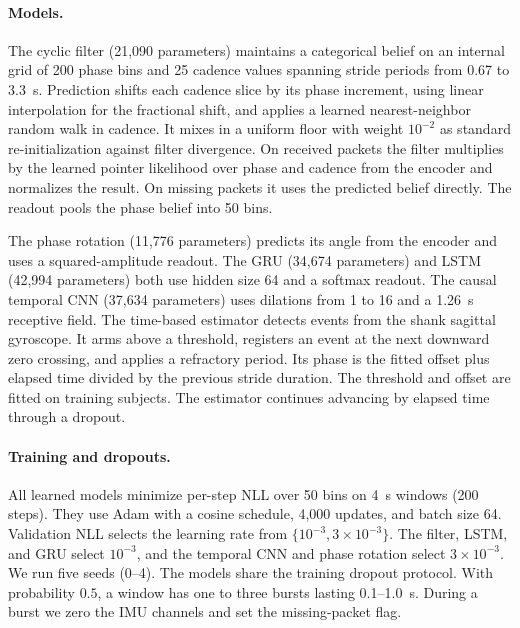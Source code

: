 \paragraph{Models.}
The cyclic filter (21,090 parameters) maintains a categorical belief on an
internal grid of 200 phase bins and 25 cadence values spanning stride periods
from 0.67 to 3.3~s. Prediction shifts each cadence slice by its phase increment,
using linear interpolation for the fractional shift, and applies a learned
nearest-neighbor random walk in cadence. It mixes in a uniform floor with
weight $10^{-2}$ as standard re-initialization against filter divergence.
On received packets the filter multiplies by the learned pointer likelihood
over phase and cadence from the encoder and normalizes the result. On missing
packets it uses the predicted belief directly. The readout pools the phase
belief into 50 bins.

The phase rotation (11,776 parameters) predicts its angle from the encoder
and uses a squared-amplitude readout. The GRU (34,674 parameters) and LSTM
(42,994 parameters) both use hidden size 64 and a softmax readout. The causal
temporal CNN (37,634 parameters) uses dilations from 1 to 16 and a 1.26~s
receptive field. The time-based estimator detects events
from the shank sagittal gyroscope. It arms above a threshold, registers an
event at the next downward zero crossing, and applies a refractory period.
Its phase is the fitted offset plus elapsed time divided by the previous
stride duration. The threshold and offset are fitted on training subjects.
The estimator continues advancing by elapsed time through a dropout.

\paragraph{Training and dropouts.}
All learned models minimize per-step NLL over 50 bins on 4~s windows
(200 steps). They use Adam with a cosine schedule, 4,000 updates, and batch
size 64. Validation NLL selects the learning rate from
$\{10^{-3},3\times10^{-3}\}$. The filter, LSTM, and GRU select $10^{-3}$, and
the temporal CNN and phase rotation select $3\times10^{-3}$. We run five
seeds (0--4). The models share the training dropout protocol. With probability
$0.5$, a window has one to three bursts lasting 0.1--1.0~s. During a burst we
zero the IMU channels and set the missing-packet flag.

